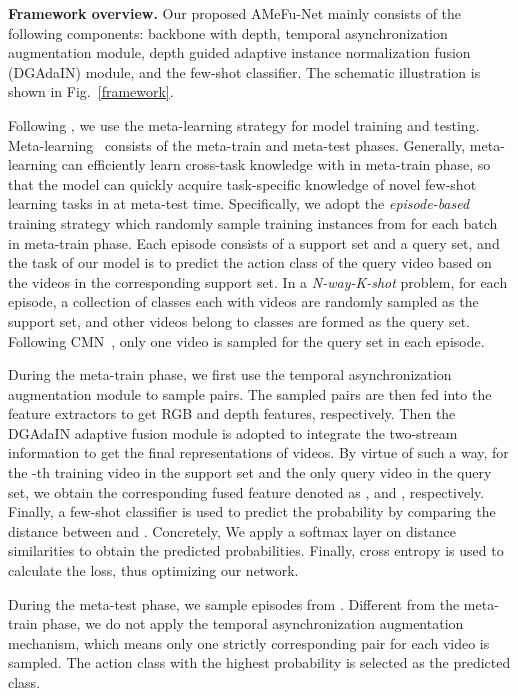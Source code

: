 \documentclass[sigconf]{acmart}
\begin{document}
	
	
	\noindent \textbf{Framework overview.} 
	Our proposed AMeFu-Net mainly consists of the following components: 
	backbone with depth, temporal asynchronization augmentation module, depth guided adaptive instance normalization fusion (DGAdaIN) module, and the few-shot classifier. The schematic illustration is shown in Fig.~\ref{framework}.  
	
	
	Following \cite{zhu2018compound}, we use the meta-learning strategy for model training and testing. Meta-learning~\cite{finn2017model} consists of the meta-train and meta-test phases. Generally, meta-learning can efficiently learn cross-task knowledge with  in meta-train phase, so that the model can quickly acquire task-specific knowledge of novel few-shot learning tasks in  at meta-test time. Specifically, we adopt the \emph{episode-based} training strategy  \cite{zhu2018compound,snell2017prototypical,sung2017learning} which randomly sample training instances from  for each batch in meta-train phase. Each episode consists of a support set and a query set, and the task of our model is to predict the action class of the query video based on the videos in the corresponding support set. In a \emph{N-way-K-shot} problem, for each episode, a collection of  classes each with  videos are randomly sampled as the support set, and other videos belong to  classes are formed as the query set. 
	Following CMN~\cite{zhu2018compound}, only one video is sampled for the query set in each episode.
	
	During the meta-train phase, we first use the temporal asynchronization augmentation module to sample  pairs. The sampled pairs are then fed into the feature extractors to get RGB and depth features, respectively. Then the DGAdaIN adaptive fusion module is adopted to integrate the two-stream information to get the final representations of videos. By virtue of such a way, for the -th training video  in the support set and the only query video  in the query set, we obtain the corresponding fused feature denoted as , and , respectively. Finally, a few-shot classifier is used to predict the probability by comparing the distance between  and . Concretely, We apply a softmax layer on distance similarities to obtain the predicted probabilities. Finally, cross entropy is used to calculate the loss, thus optimizing our network.
	
	During the meta-test phase, we sample episodes from .
	Different from the meta-train phase, we do not apply the temporal asynchronization augmentation mechanism, which means only one strictly corresponding  pair for each video is sampled. The action class with the highest probability is selected as the predicted class.
	
\end{document}
